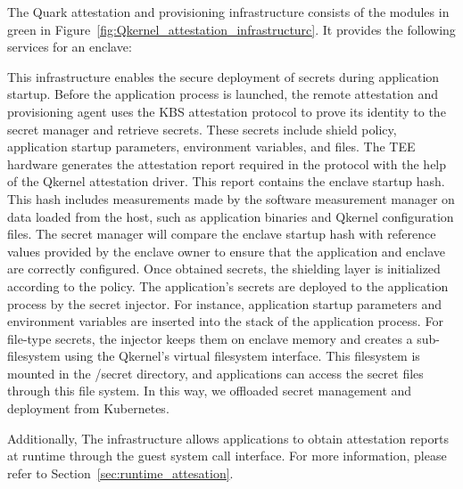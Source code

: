 The Quark attestation and provisioning infrastructure consists of the modules in green in Figure~\ref{fig:Qkernel_attestation_infrastructurc}. It provides the following services for an enclave:

This infrastructure enables the secure deployment of secrets during application startup. Before the application process is launched, the remote attestation and provisioning agent uses the KBS attestation protocol to prove its identity to the secret manager and retrieve secrets. These secrets include shield policy, application startup parameters, environment 
variables, and files. The TEE hardware generates the attestation report required in the protocol with the help of the Qkernel attestation driver. This report contains the enclave startup hash. This hash includes measurements made by the software measurement manager on data loaded from the host, such as application binaries and Qkernel configuration files. 
The secret manager will compare the enclave startup hash with reference values provided by the enclave owner to ensure that the application and enclave are correctly configured. Once obtained secrets, the shielding layer is initialized according to the policy. The application's secrets are deployed to the application process by the secret injector. 
For instance, application startup parameters and environment variables are inserted into the stack of the application process. For file-type secrets, the injector keeps them on enclave memory and creates a sub-filesystem using the Qkernel's virtual filesystem interface. This filesystem is mounted in the /secret directory, and applications can access the secret files through this file system. In this way, we offloaded secret management and deployment from Kubernetes.

Additionally, The infrastructure allows applications to obtain attestation reports at runtime through the guest system call interface. For more information, please refer to Section~\ref{sec:runtime_attesation}.

